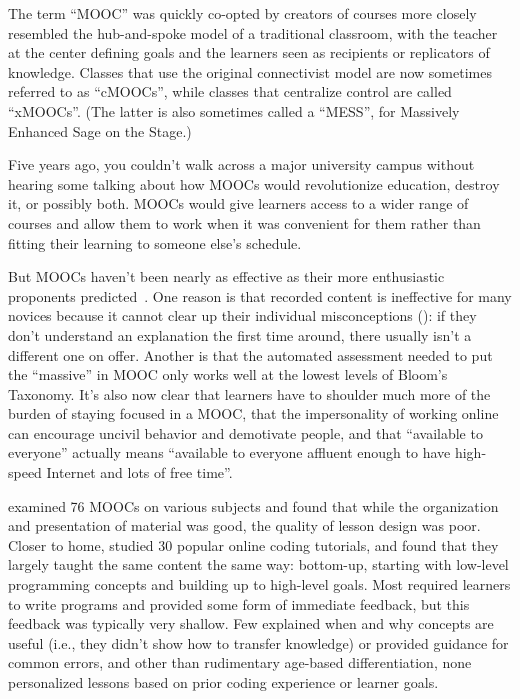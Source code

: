 The term ``MOOC'' was quickly co-opted by creators of
courses more closely resembled the hub-and-spoke model of a traditional classroom,
with the teacher at the center defining goals
and the learners seen as recipients or replicators of knowledge.
Classes that use the original connectivist model are now sometimes referred to as ``cMOOCs'',
while classes that centralize control are called ``xMOOCs''.
(The latter is also sometimes called a ``MESS'',
for Massively Enhanced Sage on the Stage.)

Five years ago,
you couldn't walk across a major university campus
without hearing some talking about how MOOCs would revolutionize education,
destroy it,
or possibly both.
MOOCs would give learners access to a wider range of courses
and allow them to work when it was convenient for them
rather than fitting their learning to someone else's schedule.

But MOOCs haven't been nearly as effective
as their more enthusiastic proponents predicted~\cite{Ubel2017}.
One reason is that
recorded content is ineffective for many novices
because it cannot clear up their individual misconceptions ():
if they don't understand an explanation the first time around,
there usually isn't a different one on offer.
Another is that the automated assessment needed to put the ``massive'' in MOOC
only works well at the lowest levels of Bloom's Taxonomy.
It's also now clear that
learners have to shoulder much more of the burden of staying focused in a MOOC,
that the impersonality of working online can encourage uncivil behavior and demotivate people,
and that ``available to everyone'' actually means
``available to everyone affluent enough to have high-speed Internet and lots of free time''.

\cite{Marg2015} examined 76 MOOCs on various subjects and found that
while the organization and presentation of material was good,
the quality of lesson design was poor.
Closer to home,
\cite{Kim2017} studied 30 popular online coding tutorials,
and found that they largely taught the same content the same way:
bottom-up,
starting with low-level programming concepts and building up to high-level goals.
Most required learners to write programs and provided some form of immediate feedback,
but this feedback was typically very shallow.
Few explained when and why concepts are useful
(i.e., they didn't show how to transfer knowledge)
or provided guidance for common errors,
and other than rudimentary age-based differentiation,
none personalized lessons based on prior coding experience or learner goals.

